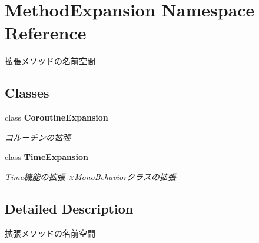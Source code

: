 \hypertarget{namespace_method_expansion}{}\section{Method\+Expansion Namespace Reference}
\label{namespace_method_expansion}


拡張メソッドの名前空間  


\subsection*{Classes}
\begin{DoxyCompactItemize}
\item 
class {\bfseries Coroutine\+Expansion}
\begin{DoxyCompactList}\small\item\em コルーチンの拡張 \end{DoxyCompactList}\item 
class {\bfseries Time\+Expansion}
\begin{DoxyCompactList}\small\item\em Time機能の拡張 ※\+Mono\+Behaviorクラスの拡張 \end{DoxyCompactList}\end{DoxyCompactItemize}


\subsection{Detailed Description}
拡張メソッドの名前空間 

